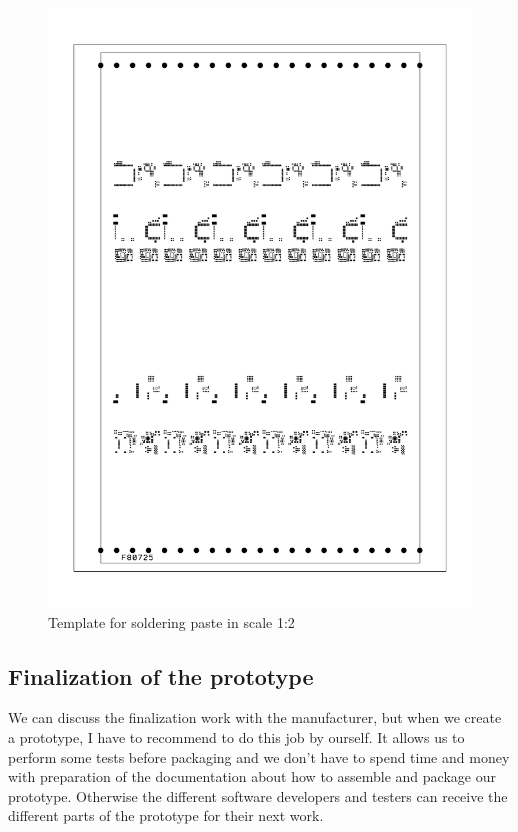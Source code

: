 \begin{figure}[H]
	\centering
	\label{smtPasteTemplate}
	\caption{Template for soldering paste in scale 1:2}
	\includegraphics[angle=90, scale=0.5]{img/smtPasteTemplate.pdf}
\end{figure}

\subsection{Finalization of the prototype}
We can discuss the finalization work with the manufacturer, but when we create a prototype, I have to recommend to do this job by ourself. It allows us to perform some tests before packaging and we don't have to spend time and money with preparation of the documentation about how to assemble and package our prototype. Otherwise the different software developers and testers can receive the different parts of the prototype for their next work.


